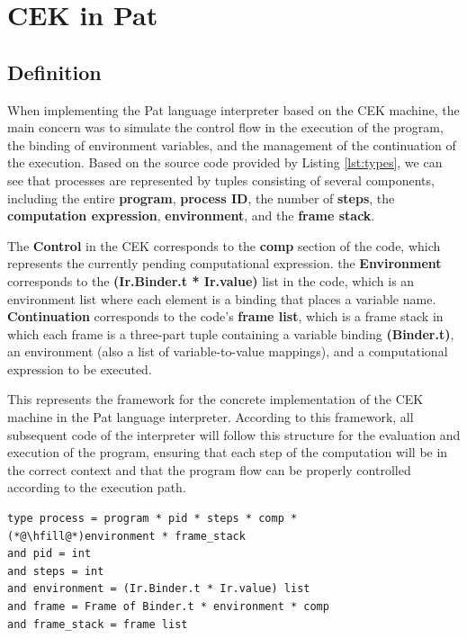 \documentclass{l4proj}
\begin{document}
\section{CEK in Pat}
\subsection{Definition}
When implementing the Pat language interpreter based on the CEK machine, the main concern was to simulate the control flow in the execution of the program, the binding of environment variables, and the management of the continuation of the execution. Based on the source code provided by Listing \ref{lst:types}, we can see that processes are represented by tuples consisting of several components, including the entire \textbf{program}, \textbf{process ID}, the number of \textbf{steps}, the \textbf{computation expression}, \textbf{environment}, and the \textbf{frame stack}.

The \textbf{Control} in the CEK corresponds to the \textbf{comp} section of the code, which represents the currently pending computational expression. the \textbf{Environment} corresponds to the \textbf{(Ir.Binder.t * Ir.value)} list in the code, which is an environment list where each element is a binding that places a variable name. \textbf{Continuation} corresponds to the code's \textbf{frame list}, which is a frame stack in which each frame is a three-part tuple containing a variable binding \textbf{(Binder.t)}, an environment (also a list of variable-to-value mappings), and a computational expression to be executed. 

This represents the framework for the concrete implementation of the CEK machine in the Pat language interpreter. According to this framework, all subsequent code of the interpreter will follow this structure for the evaluation and execution of the program, ensuring that each step of the computation will be in the correct context and that the program flow can be properly controlled according to the execution path.

\noindent\begin{minipage}{\linewidth}
\lstset{style=Ocamlstyle}
\begin{lstlisting}[caption={Source Code of CEK Framework in Pat}, label={lst:types}]
type process = program * pid * steps * comp * 
(*@\hfill@*)environment * frame_stack
and pid = int
and steps = int
and environment = (Ir.Binder.t * Ir.value) list
and frame = Frame of Binder.t * environment * comp
and frame_stack = frame list
\end{lstlisting}
\end{minipage}
\end{document}
